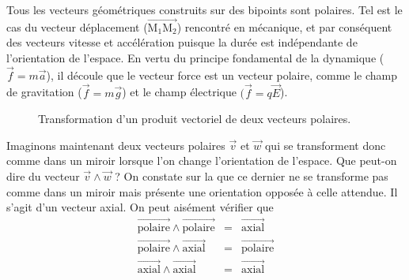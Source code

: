 Tous les vecteurs géométriques construits sur des bipoints sont polaires. Tel est le cas du vecteur déplacement ($\overrightarrow{\mathrm{M_1M_2}}$) rencontré en mécanique, et par conséquent des vecteurs vitesse et accélération puisque la durée est indépendante de l'orientation de l'espace. En vertu du principe fondamental de la dynamique ($\overrightarrow{f}=m \overrightarrow{a}$), il découle que le vecteur force est un vecteur polaire, comme le champ de gravitation ($\overrightarrow{f}=m \overrightarrow{g}$) et le champ électrique $(\overrightarrow{f}=q \overrightarrow{E}$).

\begin{figure}[htbp]
\centering
{} 
\caption{Transformation d'un produit vectoriel de deux vecteurs polaires.}
\end{figure}

Imaginons maintenant deux vecteurs polaires $\overrightarrow{v}$ et $\overrightarrow{w}$ qui se transforment donc comme dans un miroir lorsque l'on change l'orientation de l'espace. Que peut-on dire du vecteur $\overrightarrow{v}\wedge \overrightarrow{w}$ ? On constate sur la  que ce dernier ne se transforme pas comme dans un miroir mais présente une orientation opposée à celle attendue. Il s'agit d'un vecteur axial. On peut aisément vérifier que 
\[
	\begin{array}{rcl}
		\overrightarrow{\text{polaire}}\wedge \overrightarrow{\text{polaire}}&=&\overrightarrow{\text{axial}}\\
		\overrightarrow{\text{polaire}}\wedge \overrightarrow{\text{axial}}&=&\overrightarrow{\text{polaire}}\\
		\overrightarrow{\text{axial}}\wedge \overrightarrow{\text{axial}}&=&\overrightarrow{\text{axial}}
	\end{array}
\] 

